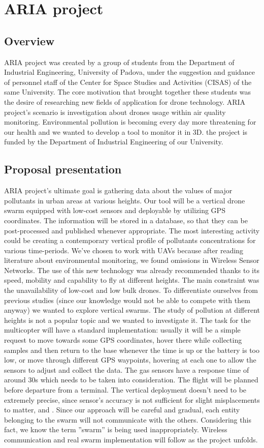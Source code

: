 \chapter{ARIA project}
\section{Overview}
ARIA project was created by a group of students from the Department of Industrial Engineering, University of Padova, under the suggestion and guidance of personnel staff of the Center for Space Studies and Activities (CISAS) of the same University. The core motivation that brought together these students was the desire of researching new fields of application for drone technology. ARIA project’s scenario is investigation about drones usage within air quality monitoring. Environmental pollution is becoming every day more threatening for our health and we wanted to develop a tool to monitor it in 3D. the project is funded by the Department of Industrial Engineering of our University.
\section{Proposal presentation}
ARIA project’s ultimate goal is gathering data about the
values of major pollutants in urban areas at various heights.
Our tool will be a vertical drone swarm equipped with low-cost sensors and deployable by utilizing GPS coordinates. The
information will be stored in a database, so that they can be
post-processed and published whenever appropriate. The most
interesting activity could be creating a contemporary vertical
profile of pollutants concentrations for various time-periods.
We’ve chosen to work with UAVs because after reading
literature about environmental monitoring, we found omissions
in Wireless Sensor Networks. The use of this new technology
was already recommended thanks to its speed, mobility and
capability to fly at different heights. The main constraint was
the unavailability of low-cost and low bulk drones.
To differentiate ourselves from previous studies (since our
knowledge would not be able to compete with them anyway)
we wanted to explore vertical swarms. The study of pollution
at different heights is not a popular topic and we wanted to
investigate it.
The task for the multicopter will have a standard implementation: usually it will be a simple request to move towards some
GPS coordinates, hover there while collecting samples and then
return to the base whenever the time is up or the battery is too
low, or move through different GPS waypoints, hovering at each one to allow the sensors to adjust and collect the data. 
The gas sensors have a response time of around 30s which needs to be taken into consideration.
The flight will be planned before departure from a
terminal. The vertical deployment doesn’t need to be extremely
precise, since sensor’s accuracy is not sufficient for slight
misplacements to matter, and  . Since our approach will be careful
and gradual, each entity belonging to the swarm will not
communicate with the others. Considering this fact, we know
the term ”swarm” is being used inappropriately. Wireless
communication and real swarm implementation will follow as
the project unfolds.

